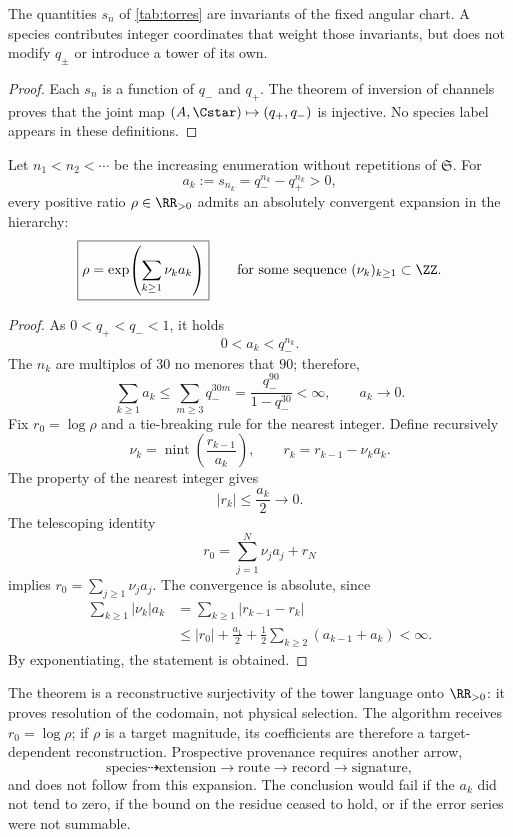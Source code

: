 \begin{proposition}
The quantities \(s_n\) of \cref{tab:torres} are invariants of the fixed
angular chart. A species contributes integer coordinates that weight those
invariants, but does not modify \(q_\pm\) or introduce a tower of its own.
\end{proposition}
\begin{proof}
Each \(s_n\) is a function of \(q_-\) and \(q_+\). The theorem of inversion of
channels proves that the joint map
\((A,\Cstar)\mapsto(q_+,q_-)\) is injective. No species label appears
in these definitions.
\end{proof}

\begin{theorem}
\label{thm:completitud-reconstructiva-torres}
Let \(n_1<n_2<\cdots\) be the increasing enumeration without repetitions of
\(\mathfrak S\). For
\[
 a_k:=s_{n_k}=q_-^{n_k}-q_+^{n_k}>0,
\]
every positive ratio \(\rho\in\RR_{>0}\) admits an absolutely
convergent expansion in the hierarchy:
\[
 \boxed{\rho=
 \exp\!\left(\sum_{k\geq1}\nu_k a_k\right)}
 \qquad\text{for some sequence }(\nu_k)_{k\geq1}\subset\ZZ.
\]
\end{theorem}

\begin{proof}
As \(0<q_+<q_-<1\), it holds
\[
 0<a_k<q_-^{n_k}.
\]
The \(n_k\) are multiplos of \(30\) no menores that \(90\); therefore,
\[
 \sum_{k\geq1}a_k
 \leq\sum_{m\geq3}q_-^{30m}
 =\frac{q_-^{90}}{1-q_-^{30}}<\infty,
 \qquad a_k\longrightarrow0.
\]
Fix \(r_0=\log\rho\) and a tie-breaking rule for the nearest integer.
Define recursively
\[
 \nu_k=\operatorname{nint}\!\left(\frac{r_{k-1}}{a_k}\right),
 \qquad
 r_k=r_{k-1}-\nu_k a_k.
\]
The property of the nearest integer gives
\[
 |r_k|\leq\frac{a_k}{2}\longrightarrow0.
\]
The telescoping identity
\[
 r_0=\sum_{j=1}^{N}\nu_j a_j+r_N
\]
implies \(r_0=\sum_{j\geq1}\nu_j a_j\). The convergence is absolute, since
\[
 \begin{aligned}
 \sum_{k\geq1}|\nu_k|a_k
 &=\sum_{k\geq1}|r_{k-1}-r_k|\\
 &\leq |r_0|+\frac{a_1}{2}
 +\frac12\sum_{k\geq2}(a_{k-1}+a_k)<\infty.
 \end{aligned}
\]
By exponentiating, the statement is obtained.
\end{proof}

\begin{remark}
The theorem is a reconstructive surjectivity of the tower language onto \(\RR_{>0}\): it proves resolution of the codomain, not physical selection. The algorithm receives \(r_0=\log\rho\); if \(\rho\) is a target magnitude, its coefficients are therefore a target-dependent reconstruction. Prospective provenance requires another arrow,
\[
 \text{species}\dashrightarrow\text{extension}
 \longrightarrow\text{route}\longrightarrow\text{record}
 \longrightarrow\text{signature},
\]
and does not follow from this expansion. The conclusion would fail if the \(a_k\) did not
tend to zero, if the bound on the residue ceased to hold, or if the error series
were not summable.
\end{remark}

